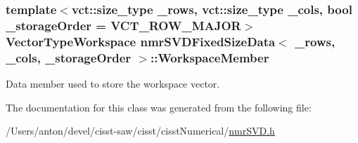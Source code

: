 \subsubsection[{Workspace\+Member}]{\setlength{\rightskip}{0pt plus 5cm}template$<$vct\+::size\+\_\+type \+\_\+rows, vct\+::size\+\_\+type \+\_\+cols, bool \+\_\+storage\+Order = V\+C\+T\+\_\+\+R\+O\+W\+\_\+\+M\+A\+J\+O\+R$>$ {\bf Vector\+Type\+Workspace} {\bf nmr\+S\+V\+D\+Fixed\+Size\+Data}$<$ \+\_\+rows, \+\_\+cols, \+\_\+storage\+Order $>$\+::Workspace\+Member\hspace{0.3cm}{\ttfamily [protected]}}\label{classnmr_s_v_d_fixed_size_data_a2821e6d6be56a77b1584b9994d7b1a83}
Data member used to store the workspace vector. 

The documentation for this class was generated from the following file\+:\begin{DoxyCompactItemize}
\item 
/\+Users/anton/devel/cisst-\/saw/cisst/cisst\+Numerical/\hyperlink{nmr_s_v_d_8h}{nmr\+S\+V\+D.\+h}\end{DoxyCompactItemize}
